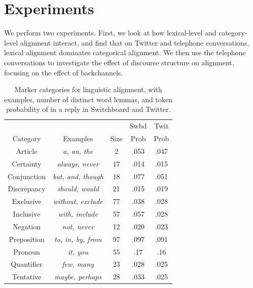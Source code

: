 \documentclass[11pt]{article}
\begin{document}
\section{Experiments}

We perform two experiments. First, we look at how lexical-level and category-level alignment interact, and find that on Twitter and telephone conversations, lexical alignment dominates categorical alignment.  We then use the telephone conversations to investigate the effect of discourse structure on alignment, focusing on the effect of backchannels.

\begin{table}
\centering
\small
\begin{tabular}{|c|c|c|c|c|} \hline
& & & Swbd & Twit \\
Category & Examples & Size & Prob & Prob\\ \hline
Article & \textit{a, an, the} & 2 & .053 & .047\\
Certainty  & \textit{always, never} & 17 & .014 & .015\\
Conjunction  & \textit{but, and, though} & 18 & .077 & .051\\
Discrepancy  & \textit{should, would} & 21 & .015 & .019\\
Exclusive  & \textit{without, exclude} & 77 & .038 & .028\\
Inclusive  & \textit{with, include} & 57 & .057 & .028\\
Negation  & \textit{not, never} & 12 & .020 & .023\\
Preposition  & \textit{to, in, by, from} & 97 & .097 & .091\\
Pronoun   & \textit{it, you} & 55 & .17 & .16\\
Quantifier  & \textit{few, many} & 23 & .028 & .025\\
Tentative & \textit{maybe, perhaps} & 28 & .033 & .025\\
\hline\end{tabular}
\caption{Marker categories for linguistic alignment, with examples, number of distinct word lemmas, and token probability of in a reply in Switchboard and Twitter.}\label{table:liwc}
\end{table}
\end{document}
